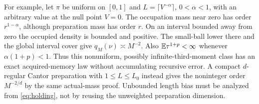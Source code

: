For example, let $\pi$ be uniform on $[0,1]$ and $L=\lceil V^{-\alpha}\rceil$, $0<\alpha<1$, with an arbitrary value at the null point $V=0$. The occupation mass near zero has order $r^{1-\alpha}$, although preparation mass has order $r$. On an interval bounded away from zero the occupied density is bounded and positive. The small-ball lower there and the global interval cover give $q_M(\nu)\asymp M^{-2}$. Also $\mathbb E\tau^{1+p}<\infty$ whenever $\alpha(1+p)<1$. Thus this nonuniform, possibly infinite-third-moment class has an exact acquired-memory law without accumulating recursive error. A compact $d$-regular Cantor preparation with $1\le L\le L_0$ instead gives the noninteger order $M^{-2/d}$ by the same actual-mass proof. Unbounded length bias must be analyzed from \eqref{eq:holding}, not by reusing the unweighted preparation dimension.

